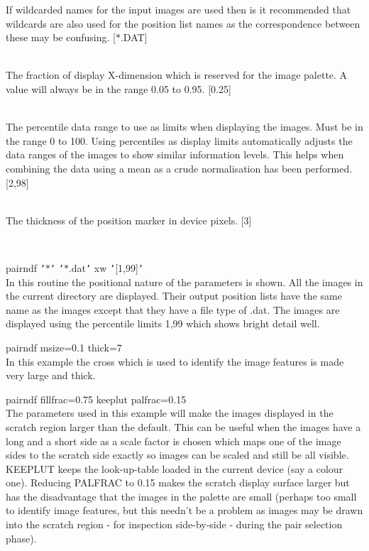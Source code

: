 \documentclass[twoside,11pt]{article}
\renewcommand{\_}{\texttt{\symbol{95}}}
\newcommand{\qs}[1]{{\tt '}#1{\tt '}}
\newcommand{\sstexamples}[1]{
   \item[Examples:] \mbox{} \\
   \vspace{-3.5ex}
   \begin{description}
      #1
   \end{description}
}
\newcommand{\sstsubsection}[1]{ \item[{#1}] \mbox{} \\}
\newcommand{\sstexamplesubsection}[2]{\sloppy \item{\ssttt #1} \mbox{} \\ #2 }
\newcommand{\sstnotes}[1]{\item[Notes:] \mbox{} \\[1.3ex] #1}
\newcommand{\sstitemlist}[1]{
  \mbox{} \\
  \vspace{-3.5ex}
  \begin{itemize}
     #1
  \end{itemize}
}
\newcommand{\sstexamples}[1]{
      \item[Examples:] \\
      \begin{description}
         #1
      \end{description}
      \\
   }
\newcommand{\sstsubsection}[1]{\item[{#1}]}
\newcommand{\sstexamplesubsection}[2]{\item[{\ssttt #1}] #2}
\newcommand{\sstnotes}[1]{\item[Notes:] #1 }
\newcommand{\sstitemlist}[1]{
      \begin{itemize}
         #1
      \end{itemize}
      \\
   }
\begin{document}
{{{         If wildcarded names for the input images are used then is it
         recommended that wildcards are also used for the position list
         names as the correspondence between these may be confusing.
         [$*$.DAT]
      }
      \sstsubsection{
         PALFRAC = \_DOUBLE (Read)
      } {
         The fraction of display X-dimension which is reserved for the
         image palette. A value will always be in the range
         0.05 to 0.95.
         [0.25]
      }
      \sstsubsection{
         PERCENTILES( 2 ) = \_DOUBLE (Read)
      } {
         The percentile data range to use as limits when displaying the
         images. Must be in the range 0 to 100. Using percentiles as
         display limits automatically adjusts the data ranges of the
         images to show similar information levels. This helps when
         combining the data using a mean as a crude normalisation has
         been performed.
         [2,98]
      }
      \sstsubsection{
         THICK = \_INTEGER (Read)
      } {
         The thickness of the position marker in device pixels.
         [3]
      }
   }
   \sstexamples{
      \sstexamplesubsection{
         pairndf \qs{$*$}  \qs{$*$.dat} xw \qs{[1,99]}
      } {
        In this routine the positional nature of the parameters is
        shown. All the images in the current directory are displayed.
        Their output position lists have the same name as the images
        except that they have a file type of .dat. The images are
        displayed using the percentile limits 1,99 which shows bright
        detail well.
      }
      \sstexamplesubsection{
         pairndf msize=0.1 thick=7
      } {
         In this example the cross which is used to identify the
         image features is made very large and thick.
      }
      \sstexamplesubsection{
         pairndf fillfrac=0.75 keeplut palfrac=0.15
      } {
         The parameters used in this example will make the images
         displayed in the scratch region larger than the default. This
         can be useful when the images have a long and a short side as
         a scale factor is chosen which maps one of the image sides to
         the scratch side exactly so images can be scaled and still be
         all visible. KEEPLUT keeps the look-up-table loaded in the
         current device (say a colour one). Reducing PALFRAC to 0.15
         makes the scratch display surface larger but has the
         disadvantage that the images in the palette are small (perhaps
         too small to identify image features, but this needn't be a
         problem as images may be drawn into the scratch region - for
         inspection side-by-side - during the pair selection phase).
      }
   }
   \sstnotes{
      \sstitemlist{

}}}
\end{document}
